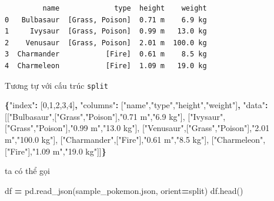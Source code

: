 \documentclass[
]{book}
\newenvironment{Shaded}{\begin{snugshade}}{\end{snugshade}}
\newcommand{\DataTypeTok}[1]{\textcolor[rgb]{0.13,0.29,0.53}{#1}}
\newcommand{\DecValTok}[1]{\textcolor[rgb]{0.00,0.00,0.81}{#1}}
\newcommand{\FunctionTok}[1]{\textcolor[rgb]{0.13,0.29,0.53}{\textbf{#1}}}
\newcommand{\NormalTok}[1]{#1}
\newcommand{\OperatorTok}[1]{\textcolor[rgb]{0.81,0.36,0.00}{\textbf{#1}}}
\newcommand{\OtherTok}[1]{\textcolor[rgb]{0.56,0.35,0.01}{#1}}
\newcommand{\StringTok}[1]{\textcolor[rgb]{0.31,0.60,0.02}{#1}}
\begin{document}
\begin{verbatim}
         name             type  height    weight
0   Bulbasaur  [Grass, Poison]  0.71 m    6.9 kg
1     Ivysaur  [Grass, Poison]  0.99 m   13.0 kg
2    Venusaur  [Grass, Poison]  2.01 m  100.0 kg
3  Charmander           [Fire]  0.61 m    8.5 kg
4  Charmeleon           [Fire]  1.09 m   19.0 kg
\end{verbatim}

Tương tự với cấu trúc \texttt{split}

\begin{Shaded}
\begin{Highlighting}[]
\FunctionTok{\{}\DataTypeTok{"index"}\FunctionTok{:}   \OtherTok{[}\DecValTok{0}\OtherTok{,}\DecValTok{1}\OtherTok{,}\DecValTok{2}\OtherTok{,}\DecValTok{3}\OtherTok{,}\DecValTok{4}\OtherTok{]}\FunctionTok{,}
 \DataTypeTok{"columns"}\FunctionTok{:} \OtherTok{[}\StringTok{"name"}\OtherTok{,}\StringTok{"type"}\OtherTok{,}\StringTok{"height"}\OtherTok{,}\StringTok{"weight"}\OtherTok{]}\FunctionTok{,}
 \DataTypeTok{"data"}\FunctionTok{:}    \OtherTok{[[}\StringTok{"Bulbasaur"}\OtherTok{,[}\StringTok{"Grass"}\OtherTok{,}\StringTok{"Poison"}\OtherTok{],}\StringTok{"0.71 m"}\OtherTok{,}\StringTok{"6.9 kg"}\OtherTok{],}
             \OtherTok{[}\StringTok{"Ivysaur"}\OtherTok{,[}\StringTok{"Grass"}\OtherTok{,}\StringTok{"Poison"}\OtherTok{],}\StringTok{"0.99 m"}\OtherTok{,}\StringTok{"13.0 kg"}\OtherTok{],}
             \OtherTok{[}\StringTok{"Venusaur"}\OtherTok{,[}\StringTok{"Grass"}\OtherTok{,}\StringTok{"Poison"}\OtherTok{],}\StringTok{"2.01 m"}\OtherTok{,}\StringTok{"100.0 kg"}\OtherTok{],}
             \OtherTok{[}\StringTok{"Charmander"}\OtherTok{,[}\StringTok{"Fire"}\OtherTok{],}\StringTok{"0.61 m"}\OtherTok{,}\StringTok{"8.5 kg"}\OtherTok{],}
             \OtherTok{[}\StringTok{"Charmeleon"}\OtherTok{,[}\StringTok{"Fire"}\OtherTok{],}\StringTok{"1.09 m"}\OtherTok{,}\StringTok{"19.0 kg"}\OtherTok{]]}\FunctionTok{\}}
\end{Highlighting}
\end{Shaded}

ta có thể gọi

\begin{Shaded}
\begin{Highlighting}[]
\NormalTok{df }\OperatorTok{=}\NormalTok{ pd.read\_json(}\StringTok{\textquotesingle{}sample\_pokemon.json\textquotesingle{}}\NormalTok{, orient}\OperatorTok{=}\StringTok{\textquotesingle{}split\textquotesingle{}}\NormalTok{)}
\NormalTok{df.head()}
\end{Highlighting}
\end{Shaded}
\end{document}

